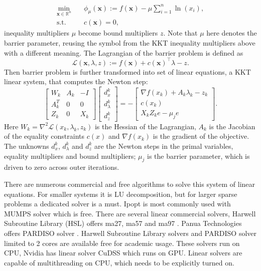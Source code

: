 \begin{equation}
    \begin{aligned}
        \min_{\mathbf{x} \in \mathbb{R}^n} \quad & \phi_\mu(\mathbf{x}) := f(\mathbf{x}) - \mu \sum_{i=1}^{n} \ln(x_i) ,\\
        \text{s.t.} \quad                        & c(\mathbf{x}) = 0,
    \end{aligned}
    \label{eq:barrier_problem}
\end{equation}
inequality multipliers $\mu$ become bound multipliers $z$. Note that $\mu$ here denotes the barrier parameter, reusing the symbol from the KKT inequality multipliers above with a different meaning.
 The Lagrangian of the barrier problem is defined as
\begin{equation}
    \mathcal{L}(\mathbf{x}, \lambda, z) := f(\mathbf{x}) + c(\mathbf{x})^\top \lambda - z.
    \label{eq:lagrangian_barrier}
\end{equation}
Then barrier problem is further transformed into set of linear equations, a KKT linear system, that
computes the Newton step:
\begin{equation}
    \begin{bmatrix}
        W_k   & A_k & -I  \\
        A_k^T & 0   & 0   \\
        Z_k   & 0   & X_k
    \end{bmatrix}
    \begin{bmatrix}
        d_x^k       \\
        d_\lambda^k \\
        d_z^k
    \end{bmatrix}
    = -
    \begin{bmatrix}
        \nabla f(x_k) + A_k \lambda_k - z_k \\
        c(x_k)                              \\
        X_k Z_k e - \mu_j e
    \end{bmatrix}.
    \label{eq:Newton-Step}
\end{equation}
Here $W_k = \nabla^2 \mathcal{L}(x_k, \lambda_k, z_k)$ is the Hessian of the Lagrangian, $A_k$ is the Jacobian of the equality constraints $c(x)$ and $\nabla f(x_k)$ is the gradient of the objective. The unknowns $d_x^k$, $d_\lambda^k$ and $d_z^k$ are the Newton steps in the primal variables, equality multipliers and bound multipliers; $\mu_j$ is the barrier parameter, which is driven to zero across outer iterations.

There are numerous commercial and free algorithms to solve this system of linear equations. For smaller
systems it is LU decomposition, but for larger sparse problems a dedicated
solver is a must. Ipopt is most commonly used with MUMPS \cite{MUMPS:1} solver
which is free. There are several linear commercial solvers, Harwell Subroutine
Library (HSL) offers ma27, ma57 and ma97 \cite{hsl2011collection}. Panua Technologies offers PARDISO solver
\cite{pardiso}. Harwell Subroutine Library solvers and PARDISO solver limited to 2 cores are available free for
academic usage. These solvers run on CPU, Nvidia has linear solver CuDSS\cite{nvidia_cudss} which runs on GPU.
Linear solvers are capable of multithreading on CPU, which needs to be explicitly
turned on. 

